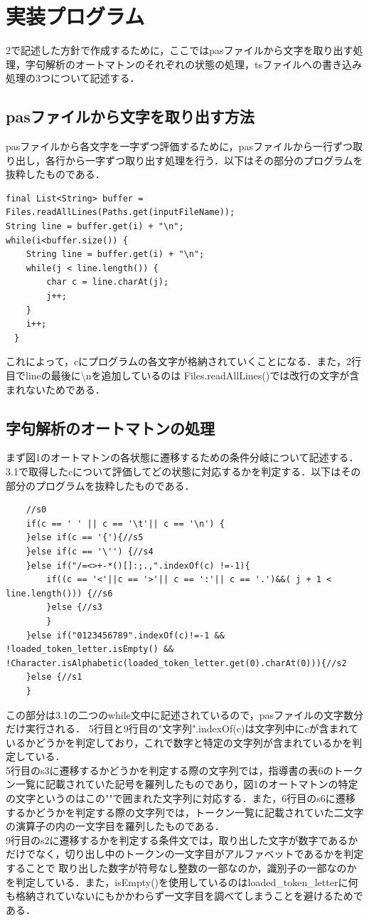\documentclass[dvipdfmx]{jarticle}
\begin{document}
\section{実装プログラム}
2で記述した方針で作成するために，ここではpasファイルから文字を取り出す処理，字句解析のオートマトンのそれぞれの状態の処理，tsファイルへの書き込み処理の3つについて記述する．
\subsection{pasファイルから文字を取り出す方法}
pasファイルから各文字を一字ずつ評価するために，pasファイルから一行ずつ取り出し，各行から一字ずつ取り出す処理を行う．以下はその部分のプログラムを抜粋したものである．
\begin{lstlisting}
final List<String> buffer = Files.readAllLines(Paths.get(inputFileName));
String line = buffer.get(i) + "\n";
while(i<buffer.size()) {
    String line = buffer.get(i) + "\n";
    while(j < line.length()) {
        char c = line.charAt(j);
        j++;
    }			
    i++;
　}
\end{lstlisting}
これによって，cにプログラムの各文字が格納されていくことになる．また，2行目でlineの最後に\textbackslash nを追加しているのは
Files.readAllLines()では改行の文字が含まれないためである．
\subsection{字句解析のオートマトンの処理}
まず図1のオートマトンの各状態に遷移するための条件分岐について記述する．3.1で取得したcについて評価してどの状態に対応するかを判定する．以下はその部分のプログラムを抜粋したものである．
\begin{lstlisting}
    //s0
    if(c == ' ' || c == '\t'|| c == '\n') {
    }else if(c == '{'){//s5
    }else if(c == '\'') {//s4
    }else if("/=<>+-*()[]:;.,".indexOf(c) !=-1){
        if((c == '<'||c == '>'|| c == ':'|| c == '.')&&( j + 1 < line.length())) {//s6
        }else {//s3
        }
    }else if("0123456789".indexOf(c)!=-1 && !loaded_token_letter.isEmpty() && !Character.isAlphabetic(loaded_token_letter.get(0).charAt(0))){//s2
    }else {//s1
    }
\end{lstlisting}
この部分は3.1の二つのwhile文中に記述されているので，pasファイルの文字数分だけ実行される．
5行目と9行目の"文字列".indexOf(c)は文字列中にcが含まれているかどうかを判定しており，これで数字と特定の文字列が含まれているかを判定している．
\\5行目のs3に遷移するかどうかを判定する際の文字列では，指導書の表6のトークン一覧に記載されていた記号を羅列したものであり，図1のオートマトンの特定の文字というのはこの""で囲まれた文字列に対応する．また，6行目のs6に遷移するかどうかを判定する際の文字列では，トークン一覧に記載されていた二文字の演算子の内の一文字目を羅列したものである．
\\9行目のs2に遷移するかを判定する条件文では，取り出した文字が数字であるかだけでなく，切り出し中のトークンの一文字目がアルファベットであるかを判定することで
取り出した数字が符号なし整数の一部なのか，識別子の一部なのかを判定している．また，isEmpty()を使用しているのはloaded\_token\_letterに何も格納されていないにもかかわらず一文字目を調べてしまうことを避けるためである．
\end{document}
